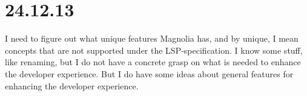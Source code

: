 \section{24.12.13}

I need to figure out what unique features Magnolia has, and by unique, I mean
concepts that are not supported under the LSP-specification. I know some stuff,
like renaming, but I do not have a concrete grasp on what is needed to enhance
the developer experience. But I do have some ideas about general features for
enhancing the developer experience.

